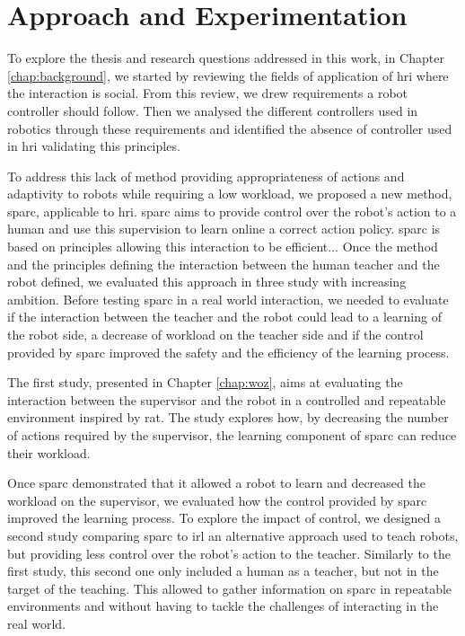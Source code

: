 \section{Approach and Experimentation}\label{sec:intro-exps}
To explore the thesis and research questions addressed in this work, in Chapter \ref{chap:background}, we started by reviewing the fields of application of \gls{hri} where the interaction is social. From this review, we drew requirements a robot controller should follow. Then we analysed the different controllers used in robotics through these requirements and identified the absence of controller used in \gls{hri} validating this principles.

To address this lack of method providing appropriateness of actions and adaptivity to robots while requiring a low workload, we proposed a new method, \gls{sparc}, applicable to \gls{hri}. \gls{sparc} aims to provide control over the robot's action to a human and use this supervision to learn online a correct action policy. \gls{sparc} is based on principles allowing this interaction to be efficient... Once the method and the principles defining the interaction between the human teacher and the robot defined, we evaluated this approach in three study with increasing ambition. Before testing \gls{sparc} in a real world interaction, we needed to evaluate if the interaction between the teacher and the robot could lead to a learning of the robot side, a decrease of workload on the teacher side and if the control provided by \gls{sparc} improved the safety and the efficiency of the learning process.

The first study, presented in Chapter \ref{chap:woz}, aims at evaluating the interaction between the supervisor and the robot in a controlled and repeatable environment inspired by \gls{rat}. The study explores how, by decreasing the number of actions required by the supervisor, the learning component of \gls{sparc} can reduce their workload.

Once \gls{sparc} demonstrated that it allowed a robot to learn and decreased the workload on the supervisor, we evaluated how the control provided by \gls{sparc} improved the learning process. To explore the impact of control, we designed a second study comparing \gls{sparc} to \gls{irl} an alternative approach used to teach robots, but providing less control over the robot's action to the teacher. Similarly to the first study, this second one only included a human as a teacher, but not in the target of the teaching. This allowed to gather information on \gls{sparc} in repeatable environments and without having to tackle the challenges of interacting in the real world.

